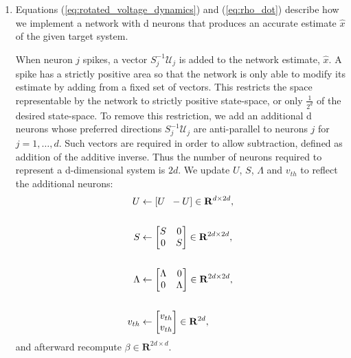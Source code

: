 \begin{enumerate}
\item Equations (\ref{eq:rotated_voltage_dynamics}) and (\ref{eq:rho_dot}) describe how we implement a network with d neurons that produces an accurate estimate $\hat{x}$ of the given target system. 


When neuron $j$ spikes, a vector $S^{-1}_j \mathcal{U}_j$ is added to the network estimate, $\hat{x}$. A spike has a strictly positive area so that the network is only able to modify its estimate by adding from a fixed set of vectors.  This restricts the space representable by the network to strictly positive state-space, or only $\frac{1}{2^d}$ of the desired state-space. To remove this restriction, we add an additional d neurons whose preferred directions $S^{-1}_j \mathcal{U}_j$ are anti-parallel to neurons $j$ for $j=1, \ldots, d$. Such vectors are required in order to allow subtraction, defined as addition of the additive inverse. Thus the number of neurons required to represent a d-dimensional system is $2d$. We update $U$, $S$, $\Lambda$ and $v_{th}$ to reflect the additional neurons:
\begin{align*}
    U &\leftarrow \left[ U \hspace{2mm} -U\right] \in \mathbf{R}^{d \times 2 d},\\
    \\
    S &\leftarrow
    \begin{bmatrix}
    S & 0 \\ 0 & S
    \end{bmatrix}
    \in \mathbf{R}^{2 d \times 2 d},\\
    \\
    \Lambda &\leftarrow
    \begin{bmatrix}
    \Lambda & 0 \\ 0 & \Lambda
    \end{bmatrix}
    \in \mathbf{R}^{2 d \times 2 d},\\
    \\
    v_{th} &\leftarrow 
    \begin{bmatrix}
    v_{th} \\ v_{th}
    \end{bmatrix} \in \mathbf{R}^{2d},
\end{align*}
and afterward recompute $\beta \in \mathbf{R}^{2 d \times d}$. 

\end{enumerate}

